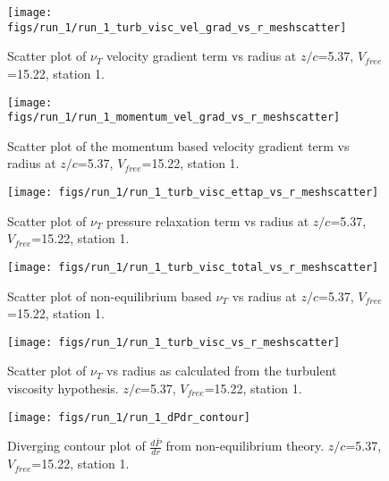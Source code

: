 \begin{figure}[H]
\centering
\texttt{[image: figs/run\_1/run\_1\_turb\_visc\_vel\_grad\_vs\_r\_meshscatter]}
\caption{Scatter plot of $\nu_T$ velocity gradient term vs radius at $z/c$=5.37, $V_{free}$=15.22, station 1.}
\end{figure}


\begin{figure}[H]
\centering
\texttt{[image: figs/run\_1/run\_1\_momentum\_vel\_grad\_vs\_r\_meshscatter]}
\caption{Scatter plot of the momentum based velocity gradient term vs radius at $z/c$=5.37, $V_{free}$=15.22, station 1.}
\end{figure}


\begin{figure}[H]
\centering
\texttt{[image: figs/run\_1/run\_1\_turb\_visc\_ettap\_vs\_r\_meshscatter]}
\caption{Scatter plot of $\nu_T$ pressure relaxation term vs radius at $z/c$=5.37, $V_{free}$=15.22, station 1.}
\end{figure}


\begin{figure}[H]
\centering
\texttt{[image: figs/run\_1/run\_1\_turb\_visc\_total\_vs\_r\_meshscatter]}
\caption{Scatter plot of non-equilibrium based $\nu_T$ vs radius at $z/c$=5.37, $V_{free}$=15.22, station 1.}
\end{figure}


\begin{figure}[H]
\centering
\texttt{[image: figs/run\_1/run\_1\_turb\_visc\_vs\_r\_meshscatter]}
\caption{Scatter plot of $\nu_T$ vs radius as calculated from the turbulent viscosity hypothesis. $z/c$=5.37, $V_{free}$=15.22, station 1.}
\end{figure}


\begin{figure}[H]
\centering
\texttt{[image: figs/run\_1/run\_1\_dPdr\_contour]}
\caption{Diverging contour plot of $\frac{d\bar{P}}{dr}$ from non-equilibrium theory. $z/c$=5.37, $V_{free}$=15.22, station 1.}
\end{figure}


